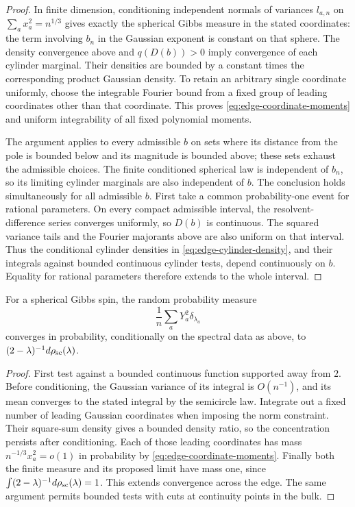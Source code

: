 \begin{proof}
In finite dimension, conditioning independent normals of variances
$l_{a,n}$ on $\sum_a x_a^2=n^{1/3}$ gives exactly the spherical Gibbs
measure in the stated coordinates: the term involving $b_n$ in the Gaussian
exponent is constant on that sphere.  The density convergence above and
$q(D(b))>0$ imply convergence of each cylinder marginal.  Their densities
are bounded by a constant times the corresponding product Gaussian
density.  To retain an arbitrary single coordinate uniformly, choose the
integrable Fourier bound from a fixed group of leading coordinates other
than that coordinate.  This proves \eqref{eq:edge-coordinate-moments}
and uniform integrability of all fixed polynomial moments.

The argument applies to every admissible $b$ on sets where its distance
from the pole is bounded below and its magnitude is bounded above; these
sets exhaust the admissible choices.  The finite conditioned spherical law
is independent of $b_n$, so its limiting cylinder marginals are also
independent of $b$.  The conclusion holds simultaneously for all
admissible $b$.  First take a common probability-one event for rational
parameters.  On every compact admissible interval, the resolvent-difference
series converges uniformly, so $D(b)$ is continuous.  The squared variance
tails and the Fourier majorants above are also uniform on that interval.
Thus the conditional cylinder densities in
\eqref{eq:edge-cylinder-density}, and their integrals against bounded
continuous cylinder tests, depend continuously on $b$.  Equality for
rational parameters therefore extends to the whole interval.
\end{proof}

\begin{lemma}\label{lem:edge-bulk-weight}
For a spherical Gibbs spin, the random probability measure
\[
 \frac1n\sum_a Y_a^2\delta_{\lambda_a}
\]
converges in probability, conditionally on the spectral data as above, to
$(2-\lambda)^{-1}d\rho_{\rm sc}(\lambda)$.
\end{lemma}

\begin{proof}
First test against a bounded continuous function supported away from $2$.
Before conditioning, the Gaussian variance of its integral is $O(n^{-1})$,
and its mean converges to the stated integral by the semicircle law.
Integrate out a fixed number of leading Gaussian coordinates when imposing
the norm constraint.  Their square-sum density gives a bounded density
ratio, so the concentration persists after conditioning.  Each of those
leading coordinates has mass $n^{-1/3}x_a^2=o(1)$ in probability by
\eqref{eq:edge-coordinate-moments}.  Finally both the finite measure and
its proposed limit have mass one, since
$\int(2-\lambda)^{-1}d\rho_{\rm sc}(\lambda)=1$.  This extends convergence
across the edge.  The same argument permits bounded tests with cuts at
continuity points in the bulk.
\end{proof}

